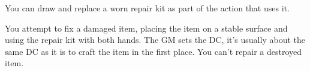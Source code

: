 


You can draw and replace a worn repair kit as part of the action that uses it.

You attempt to fix a damaged item, placing the item on a stable surface and using the repair kit with both hands.
The GM sets the DC, it's usually about the same DC as it is to craft the item in the first place.
You can't repair a destroyed item.


 
 

\vfill

\hfill{}
